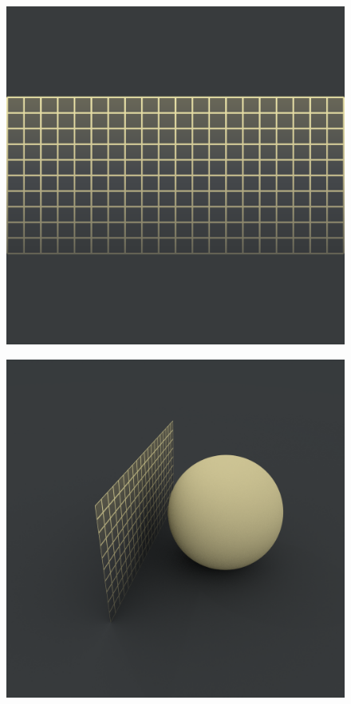 			\begin{figure}[H]
				\centering
				\begin{minipage}{.5\textwidth}
					\centering
					\includegraphics[width=0.95\linewidth]{figures/def0.png}
					\label{fig:def0}
				\end{minipage}%
				\begin{minipage}{.5\textwidth}
					\centering
					\includegraphics[width=0.95\linewidth]{figures/def1.png}
					\label{fig:def1}
				\end{minipage}
				
			\end{figure}

